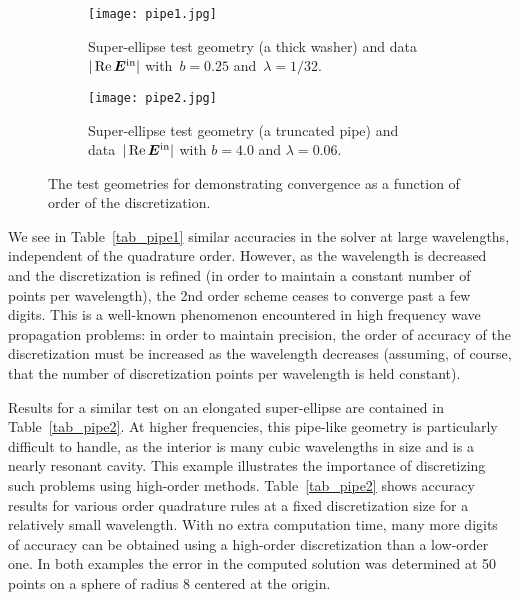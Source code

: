 \documentclass[11pt]{article}
\DeclareMathOperator{\realpart}{Re}
\newcommand{\vct}{\vectorsym}
\newcommand\bEin{\vct{E}^\textnormal{in}}
\numberwithin{equation}{section}
\begin{document}
\begin{figure}[t]
  \centering
  \begin{subfigure}[b]{.45\linewidth}
    \centering
    \texttt{[image: pipe1.jpg]}
    \caption{Super-ellipse test geometry (a thick washer)
      and data~$|\realpart \bEin|$ with~$b=0.25$ and~$\lambda=1/32$.}
    \label{fig_pipe1}
  \end{subfigure}
  \hfill
  \begin{subfigure}[b]{.45\linewidth}
    \centering
    \texttt{[image: pipe2.jpg]}
    \caption{Super-ellipse test geometry (a truncated pipe) and
      data~$|\realpart \bEin|$ with $b=4.0$ and $\lambda=0.06$.}
    \label{fig_pipe2}
  \end{subfigure}
  \caption{The test geometries for demonstrating convergence as a
    function of order of the discretization.}
  \label{fig_pipe}
\end{figure}


We see in Table~\ref{tab_pipe1} similar accuracies in the solver at
large wavelengths, independent of the quadrature order.
However, as the wavelength is decreased and the
discretization is refined (in order to maintain a constant number
of points per wavelength), the 2nd order scheme ceases to converge past a few
digits. This is a well-known phenomenon encountered in high
frequency wave propagation problems: in order to maintain precision,
the order of accuracy of the discretization must be increased as the wavelength
decreases (assuming, of course, that the number of discretization points per
wavelength is held constant).

Results for a similar test on an elongated super-ellipse are contained
in Table~\ref{tab_pipe2}.
At higher frequencies, this pipe-like geometry
is particularly difficult to handle, as the interior is many cubic wavelengths
in size and is a nearly resonant cavity.
This example illustrates the importance of
discretizing such problems using high-order
methods.
Table~\ref{tab_pipe2} shows accuracy results for various
order quadrature rules 
at a fixed discretization size for a relatively
small wavelength. With no extra computation time, many more digits of
accuracy can be obtained using a high-order discretization than a
low-order one.
In both examples the error in the computed solution was
determined at 50 points on a sphere of radius 8 centered at the origin.

  
\end{document}
